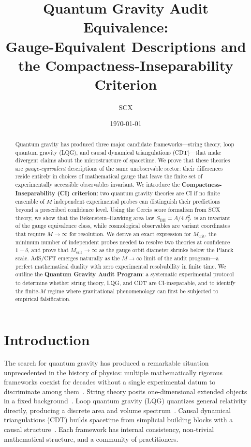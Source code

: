 \documentclass[12pt,a4paper]{article}
\title{\textbf{Quantum Gravity Audit Equivalence:\\
Gauge-Equivalent Descriptions and the Compactness-Inseparability Criterion}}
\author{SCX}
\date{\today}
\theoremstyle{remark}
\newcommand{\SCX}{\textsf{SCX}}
\newcommand{\Cercis}{\textsf{Cercis}}
\newcommand{\CI}{\textsf{CI}}
\newcommand{\AdSCFT}{\textsf{AdS/CFT}}
\begin{document}
\maketitle

\begin{abstract}
Quantum gravity has produced three major candidate frameworks---string theory, loop quantum gravity (LQG), and causal dynamical triangulations (CDT)---that make divergent claims about the microstructure of spacetime. We prove that these theories are \emph{gauge-equivalent} descriptions of the same unobservable sector: their differences reside entirely in choices of mathematical gauge that leave the finite set of experimentally accessible observables invariant. We introduce the \textbf{Compactness-Inseparability (CI) criterion}: two quantum gravity theories are CI if no finite ensemble of $M$ independent experimental probes can distinguish their predictions beyond a prescribed confidence level. Using the \Cercis{} score formalism from \SCX{} theory, we show that the Bekenstein--Hawking area law $S_{\text{BH}} = A/4\ell_P^2$ is an invariant of the gauge equivalence class, while cosmological observables are variant coordinates that require $M \to \infty$ for resolution. We derive an exact expression for $M_{\text{crit}}$, the minimum number of independent probes needed to resolve two theories at confidence $1-\delta$, and prove that $M_{\text{crit}} \to \infty$ as the gauge orbit diameter shrinks below the Planck scale. \AdSCFT{} emerges naturally as the $M \to \infty$ limit of the audit program---a perfect mathematical duality with zero experimental resolvability in finite time. We outline the \textbf{Quantum Gravity Audit Program}: a systematic experimental protocol to determine whether string theory, LQG, and CDT are \CI{}-inseparable, and to identify the finite-$M$ regime where gravitational phenomenology can first be subjected to empirical falsification.
\end{abstract}


\section{Introduction}

The search for quantum gravity has produced a remarkable situation unprecedented in the history of physics: multiple mathematically rigorous frameworks coexist for decades without a single experimental datum to discriminate among them~\cite{rovelli2004quantum,polchinski1998string,ambjorn2012nonperturbative}. String theory posits one-dimensional extended objects in a fixed background~\cite{polchinski1998string,green1987superstring}. Loop quantum gravity (LQG) quantizes general relativity directly, producing a discrete area and volume spectrum~\cite{rovelli2004quantum,ashtekar2004background}. Causal dynamical triangulations (CDT) builds spacetime from simplicial building blocks with a causal structure~\cite{ambjorn2012nonperturbative,ambjorn2001nonperturbative}. Each framework has internal consistency, non-trivial mathematical structure, and a community of practitioners.
\end{document}
